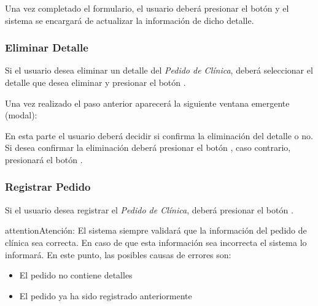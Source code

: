 \documentclass[a4paper,10pt,spanish]{sphinxmanual}
\begin{document}
Una vez completado el formulario, el usuario deberá presionar el botón  y el sistema se encargará de actualizar la información de dicho detalle.


\subsubsection{Eliminar Detalle}
\label{pedidosclinica:eliminar-detalle-pc}\label{pedidosclinica:eliminar-detalle}
Si el usuario desea eliminar un detalle del \emph{Pedido de Clínica}, deberá seleccionar el detalle que desea eliminar y presionar el botón .


Una vez realizado el paso anterior aparecerá la siguiente ventana emergente (modal):


En esta parte el usuario deberá decidir si confirma la eliminación del detalle o no. Si desea confirmar la eliminación deberá presionar el botón , caso contrario, presionará el botón .


\subsubsection{Registrar Pedido}
\label{pedidosclinica:registrar-pedido}\label{pedidosclinica:registrar-pedido-pc}
Si el usuario desea registrar el \emph{Pedido de Clínica}, deberá presionar el botón .


\begin{notice}{attention}{Atención:}
El sistema siempre validará que la información del pedido de clínica sea correcta. En caso de que esta información sea incorrecta el sistema lo informará.
En este punto, las posibles causas de errores son:
\begin{itemize}
\item {} 
El pedido no contiene detalles

\item {} 
El pedido ya ha sido registrado anteriormente

\end{itemize}
\end{notice}
\end{document}
